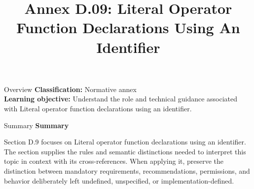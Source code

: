 \documentclass[10pt,letterpaper]{article}
\title{Annex D.09: Literal Operator Function Declarations Using An Identifier}
\author{}
\date{}
\begin{document}
\maketitle
\begin{CornellOverviewBox}{Overview}
\textbf{Classification:} Normative annex\\[2pt]
\textbf{Learning objective:} Understand the role and technical guidance associated with Literal operator function declarations using an identifier.
\end{CornellOverviewBox}\begin{CornellSummaryBox}{Summary}
{\sffamily\bfseries\color{Accent} Summary}\par\vspace{3pt}Section D.9 focuses on Literal operator function declarations using an identifier. The section supplies the rules and semantic distinctions needed to interpret this topic in context with its cross-references. When applying it, preserve the distinction between mandatory requirements, recommendations, permissions, and behavior deliberately left undefined, unspecified, or implementation-defined.
\end{CornellSummaryBox}
\end{document}
